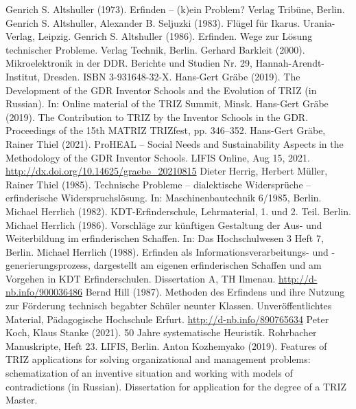 \documentclass[11pt,a4paper]{article}
\begin{document}
\begin{thebibliography}{xxx}
 Genrich S. Altshuller (1973). Erfinden – (k)ein
  Problem?  Verlag Tribüne, Berlin.
 Genrich S. Altshuller, Alexander B. Seljuzki (1983).
  Flügel für Ikarus. Urania-Verlag, Leipzig.
 Genrich S. Altshuller (1986). Erfinden. Wege zur
  Lösung technischer Probleme. Verlag Technik, Berlin.
 Gerhard Barkleit (2000). Mikroelektronik in der DDR.
  Berichte und Studien Nr. 29, Hannah-Arendt-Institut, Dresden.  ISBN
  3-931648-32-X.
 Hans-Gert Gräbe (2019). The Development of the GDR
  Inventor Schools and the Evolution of TRIZ (in Russian). In: Online material
  of the TRIZ Summit, Minsk.
 Hans-Gert Gräbe (2019). The Contribution to TRIZ by the
  Inventor Schools in the GDR. Proceedings of the 15th MATRIZ TRIZfest, pp.
  346--352.
 Hans-Gert Gräbe, Rainer Thiel (2021). ProHEAL – Social
  Needs and Sustainability Aspects in the Methodology of the GDR Inventor
  Schools.  LIFIS Online,  Aug 15, 2021.
  \url{http://dx.doi.org/10.14625/graebe_20210815}
 Dieter Herrig, Herbert Müller, Rainer Thiel (1985).
  Technische Probleme -- dialektische Widersprüche -- erfinderische
  Widerspruchslösung.  In: Maschinenbautechnik 6/1985, Berlin.
 Michael Herrlich (1982). KDT-Erfinderschule,
  Lehrmaterial, 1. und 2. Teil.  Berlin.
 Michael Herrlich (1986). Vorschläge zur künftigen
  Gestaltung der Aus- und Weiterbildung im erfinderischen Schaffen. In: Das
  Hochschulwesen 3 Heft 7, Berlin.
 Michael Herrlich (1988). Erfinden als
  Informationsverarbeitungs- und \mbox{-gene}\-rierungs\-prozess, dargestellt
  am eigenen erfinderischen Schaffen und am Vorgehen in KDT Erfinderschulen.
  Dissertation A, TH Ilmenau. \url{http://d-nb.info/900036486}
 Bernd Hill (1987). Methoden des Erfindens und ihre Nutzung
  zur Förderung technisch begabter Schüler neunter Klassen. Unveröffentlichtes
  Material, Pädagogische Hochschule Erfurt.
  \url{http://d-nb.info/890765634}
 Peter Koch, Klaus Stanke (2021). 50 Jahre systematische
  Heuristik.  Rohrbacher Manuskripte, Heft 23. LIFIS, Berlin.
 Anton Kozhemyako (2019). Features of TRIZ applications
  for solving organizational and management problems: schematization of an
  inventive situation and working with models of contradictions (in Russian).
  Dissertation for application for the degree of a TRIZ Master.

\end{thebibliography}
\end{document}
